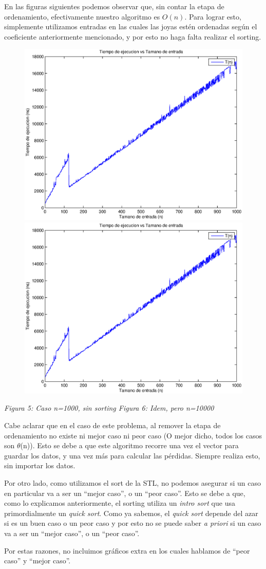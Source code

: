 En las figuras siguientes podemos observar que, sin contar la etapa de ordenamiento, efectivamente nuestro algoritmo es $O(n)$. Para lograr esto, simplemente utilizamos entradas en las cuales las joyas estén ordenadas según el coeficiente anteriormente mencionado, y por esto no haga falta realizar el sorting.

\begin{figure}[H]
    \includegraphics[width=0.5\linewidth]{problema1/graficos/problema1_aleatoria_1000.eps}
    \includegraphics[width=0.5\linewidth]{problema1/graficos/problema1_aleatoria_1000.eps}
\end{figure}
\emph{\hspace{2cm}Figura 5: Caso n=1000, sin sorting \hspace{2,5cm}Figura 6: Idem, pero n=10000}

Cabe aclarar que en el caso de este problema, al remover la etapa de ordenamiento no existe ni mejor caso ni peor caso (O mejor dicho, todos los casos son $\theta$(n)). Esto se debe a que este algoritmo recorre una vez el vector para guardar los datos, y una vez más para calcular las pérdidas. Siempre realiza esto, sin importar los datos.

Por otro lado, como utilizamos el sort de la STL, no podemos asegurar si un caso en particular va a ser un ``mejor caso'', o un ``peor caso''. Esto se debe a que, como lo explicamos anteriormente, el sorting utiliza un \emph{intro sort} que usa primordialmente un \emph{quick sort}. Como ya sabemos, el \emph{quick sort} depende del azar si es un buen caso o un peor caso y por esto no se puede saber \emph{a priori} si un caso va a ser un ``mejor caso'', o un ``peor caso''.

Por estas razones, no incluimos gráficos extra en los cuales hablamos de ``peor caso'' y ``mejor caso''.